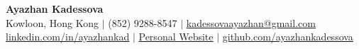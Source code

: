 \documentclass[letterpaper,10.5pt]{article}
\begin{document}

\begin{center}
    \textbf{\Huge Ayazhan Kadessova} \\ \vspace{1pt}
    \small Kowloon, Hong Kong $|$ \small (852) 9288-8547 $|$ \href{mailto:kadessovaayazhan@gmail.com}{\underline{kadessovaayazhan@gmail.com}} \\
    \vspace{1pt}
\href{https://linkedin.com/in/ayazhankad}{\underline{linkedin.com/in/ayazhankad}} $|$ \href{https://ayazhan-kadessova.netlify.app/}{\underline{Personal Website}} $|$ \href{https://github.com/ayazhankadessova}{\underline{github.com/ayazhankadessova}}
\end{center}
\end{document}
